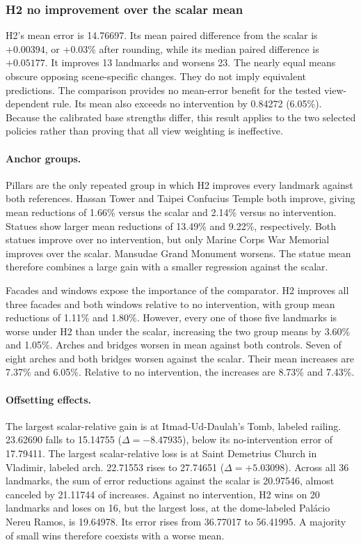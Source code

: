 \subsubsection{H2 no improvement over the scalar mean}
H2's mean error is 14.76697. Its mean paired difference from the scalar is $+0.00394$, or +0.03\% after rounding, while its median paired difference is $+0.05177$. It improves 13 landmarks and worsens 23. The nearly equal means obscure opposing scene-specific changes. They do not imply equivalent predictions. The comparison provides no mean-error benefit for the tested view-dependent rule. Its mean also exceeds no intervention by 0.84272 (6.05\%). Because the calibrated base strengths differ, this result applies to the two selected policies rather than proving that all view weighting is ineffective.

\paragraph{Anchor groups.}
Pillars are the only repeated group in which H2 improves every landmark against both references. Hassan Tower and Taipei Confucius Temple both improve, giving mean reductions of 1.66\% versus the scalar and 2.14\% versus no intervention. Statues show larger mean reductions of 13.49\% and 9.22\%, respectively. Both statues improve over no intervention, but only Marine Corps War Memorial improves over the scalar. Mansudae Grand Monument worsens. The statue mean therefore combines a large gain with a smaller regression against the scalar.

Facades and windows expose the importance of the comparator. H2 improves all three facades and both windows relative to no intervention, with group mean reductions of 1.11\% and 1.80\%. However, every one of those five landmarks is worse under H2 than under the scalar, increasing the two group means by 3.60\% and 1.05\%. Arches and bridges worsen in mean against both controls. Seven of eight arches and both bridges worsen against the scalar. Their mean increases are 7.37\% and 6.05\%. Relative to no intervention, the increases are 8.73\% and 7.43\%.

\paragraph{Offsetting effects.}
The largest scalar-relative gain is at Itmad-Ud-Daulah's Tomb, labeled railing. 23.62690 falls to 15.14755 ($\Delta=-8.47935$), below its no-intervention error of 17.79411. The largest scalar-relative loss is at Saint Demetrius Church in Vladimir, labeled arch. 22.71553 rises to 27.74651 ($\Delta=+5.03098$). Across all 36 landmarks, the sum of error reductions against the scalar is 20.97546, almost canceled by 21.11744 of increases. Against no intervention, H2 wins on 20 landmarks and loses on 16, but the largest loss, at the dome-labeled Pal\'acio Nereu Ramos, is 19.64978. Its error rises from 36.77017 to 56.41995. A majority of small wins therefore coexists with a worse mean.

